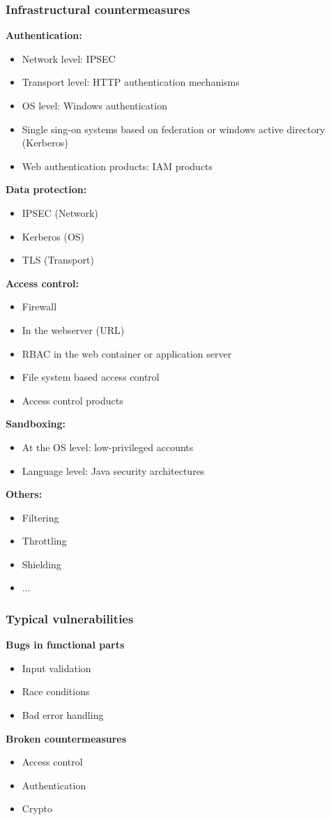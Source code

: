 \subsubsection{Infrastructural countermeasures}
\textbf{Authentication:}
\begin{itemize}
    \item Network level: IPSEC
    \item Transport level: HTTP authentication mechanisms
    \item OS level: Windows authentication
    \item Single sing-on systems based on federation or windows active directory (Kerberos)
    \item Web authentication products: IAM products
\end{itemize}
\textbf{Data protection:}
\begin{itemize}
    \item IPSEC (Network)
    \item Kerberos (OS)
    \item TLS (Transport)
\end{itemize}
\textbf{Access control:}
\begin{itemize}
    \item Firewall
    \item In the webserver (URL)
    \item RBAC in the web container or application server
    \item File system based access control
    \item Access control products
\end{itemize}
\textbf{Sandboxing:}
\begin{itemize}
    \item At the OS level: low-privileged accounts
    \item Language level: Java security architectures
\end{itemize}
\textbf{Others:}
\begin{itemize}
    \item Filtering
    \item Throttling
    \item Shielding
    \item ...
\end{itemize}

\subsubsection{Typical vulnerabilities}
\textbf{Bugs in functional parts}
\begin{itemize}
    \item Input validation
    \item Race conditions
    \item Bad error handling
\end{itemize}
\textbf{Broken countermeasures}
\begin{itemize}
    \item Access control
    \item Authentication
    \item Crypto
\end{itemize}

